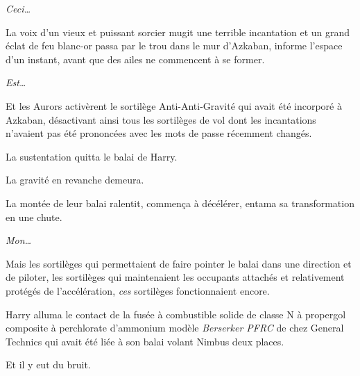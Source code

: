 \emph{Ceci…}

La voix d'un vieux et puissant sorcier mugit une terrible incantation et un grand éclat de feu blanc-or passa par le trou dans le mur d'Azkaban, informe l'espace d'un instant, avant que des ailes ne commencent à se former.

\emph{Est…}

Et les Aurors activèrent le sortilège Anti-Anti-Gravité qui avait été incorporé à Azkaban, désactivant ainsi tous les sortilèges de vol dont les incantations n'avaient pas été prononcées avec les mots de passe récemment changés.

La sustentation quitta le balai de Harry.

La gravité en revanche demeura.

La montée de leur balai ralentit, commença à décélérer, entama sa transformation en une chute.

\emph{Mon…}

Mais les sortilèges qui permettaient de faire pointer le balai dans une direction et de piloter, les sortilèges qui maintenaient les occupants attachés et relativement protégés de l'accélération, \emph{ces} sortilèges fonctionnaient encore.


Harry alluma le contact de la fusée à combustible solide de classe N à propergol composite à perchlorate d'ammonium modèle \emph{Berserker PFRC} de chez General Technics qui avait été liée à son balai volant Nimbus  deux places.

Et il y eut du bruit. 

